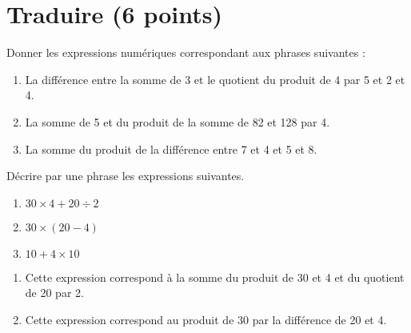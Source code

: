 \section{Traduire (6 points)}

\begin{questions}
	\question[3] Donner les expressions numériques correspondant aux phrases suivantes :
	
	\begin{enumerate}
		\item La différence entre la somme de 3 et le quotient du produit de 4 par 5 et 2 et 4.
		
		\item La somme de 5 et du produit de la somme de 82 et 128 par 4.
		\item La somme du produit de la différence entre 7 et 4 et 5 et 8. 
	\end{enumerate}
	\question[3] Décrire par une phrase les expressions suivantes.
	
	\begin{multicols}{3}
		\begin{enumerate}
			\item $30 \times 4 + 20 \div 2$
			\item $30 \times (20 - 4)$
			\item $10 + 4 \times 10$
		\end{enumerate}
	\end{multicols}	

	
	\begin{solution}
		\begin{multicols}{2}
			\begin{enumerate}
				\item Cette expression correspond à la somme du produit de 30 et 4 et du quotient de 20 par 2.
					
				\item Cette expression correspond au produit de 30 par la différence de 20 et 4.
			\end{enumerate}
		
		\end{multicols}
	\end{solution}
	
\end{questions}
